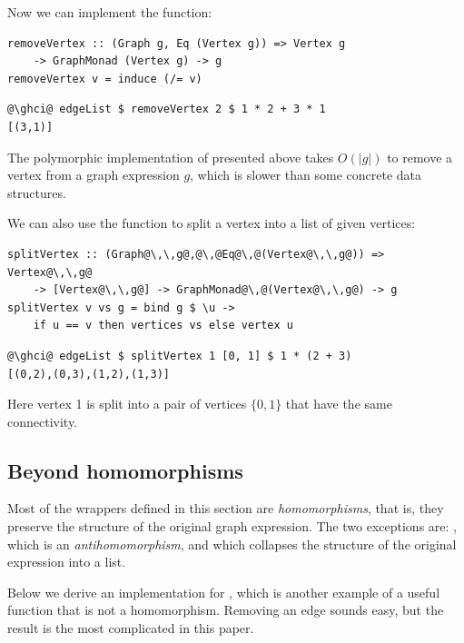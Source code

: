 Now we can implement the  function:

\begin{verbatim}
removeVertex :: (Graph g, Eq (Vertex g)) => Vertex g
    -> GraphMonad (Vertex g) -> g
removeVertex v = induce (/= v)
\end{verbatim}
\vspace{1mm}
\begin{verbatim}
@\ghci@ edgeList $ removeVertex 2 $ 1 * 2 + 3 * 1
[(3,1)]
\end{verbatim}

The polymorphic implementation of  presented above takes
$O(|g|)$ to remove a vertex from a graph expression $g$, which is
slower than some concrete data structures.

We can also use the  function to split a vertex into a list of given vertices:

\begin{verbatim}
splitVertex :: (Graph@\,\,g@,@\,@Eq@\,@(Vertex@\,\,g@)) => Vertex@\,\,g@
    -> [Vertex@\,\,g@] -> GraphMonad@\,@(Vertex@\,\,g@) -> g
splitVertex v vs g = bind g $ \u ->
    if u == v then vertices vs else vertex u
\end{verbatim}
\vspace{1mm}
\begin{verbatim}
@\ghci@ edgeList $ splitVertex 1 [0, 1] $ 1 * (2 + 3)
[(0,2),(0,3),(1,2),(1,3)]
\end{verbatim}

\noindent
Here vertex 1 is split into a pair of vertices $\{0, 1\}$ that have the same connectivity.

\subsection{Beyond homomorphisms}\label{sub-beyond}

Most of the  wrappers defined in this section are \emph{homomorphisms},
that is, they preserve the structure of the original graph expression. The two
exceptions are: , which is an \emph{antihomomorphism}, and
 which collapses the structure of the original expression into a list.

Below we derive an implementation for , which is another
example of a useful function that is not a homomorphism. Removing an edge sounds
easy, but the result is the most complicated  in this paper.

